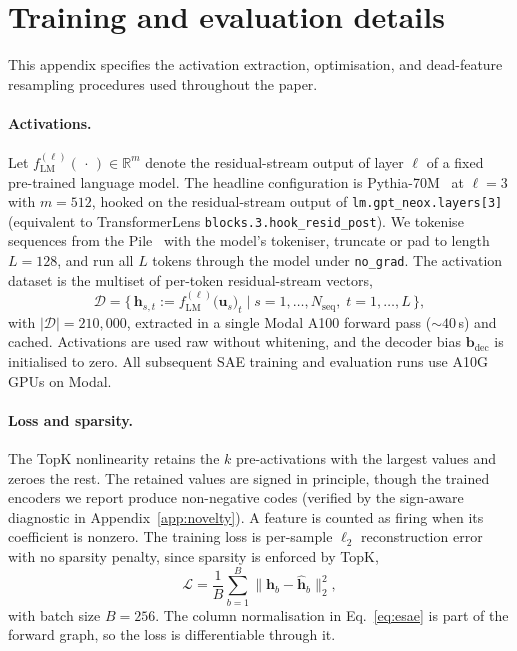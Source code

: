 \documentclass{article}
\theoremstyle{plain}
\theoremstyle{definition}
\theoremstyle{remark}
\begin{document}
\section{Training and evaluation details}
\label{app:training_details}

This appendix specifies the activation extraction, optimisation, and dead-feature resampling procedures used throughout the paper.

\paragraph{Activations.} Let $f_{\mathrm{LM}}^{(\ell)}(\,\cdot\,) \in \mathbb{R}^m$ denote the residual-stream output of layer $\ell$ of a fixed pre-trained language model. The headline configuration is Pythia-70M~\citep{biderman2023pythia} at $\ell = 3$ with $m = 512$, hooked on the residual-stream output of \texttt{lm.gpt\_neox.layers[3]} (equivalent to TransformerLens \texttt{blocks.3.hook\_resid\_post}). We tokenise sequences from the Pile~\citep{gao2020pile} with the model's tokeniser, truncate or pad to length $L = 128$, and run all $L$ tokens through the model under \texttt{no\_grad}. The activation dataset is the multiset of per-token residual-stream vectors,
\begin{equation}
    \label{eq:dataset}
    \mathcal{D} = \bigl\{\, \mathbf{h}_{s,t} := f_{\mathrm{LM}}^{(\ell)}\!\bigl(\mathbf{u}_s\bigr)_t \;\big|\; s = 1, \ldots, N_{\mathrm{seq}}, \; t = 1, \ldots, L \,\bigr\},
\end{equation}
with $|\mathcal{D}| = 210{,}000$, extracted in a single Modal A100 forward pass ($\sim\!40$\,s) and cached. Activations are used raw without whitening, and the decoder bias $\mathbf{b}_{\mathrm{dec}}$ is initialised to zero. All subsequent SAE training and evaluation runs use A10G GPUs on Modal.

\paragraph{Loss and sparsity.} The TopK nonlinearity retains the $k$ pre-activations with the largest values and zeroes the rest. The retained values are signed in principle, though the trained encoders we report produce non-negative codes (verified by the sign-aware diagnostic in Appendix~\ref{app:novelty}). A feature is counted as firing when its coefficient is nonzero. The training loss is per-sample $\ell_2$ reconstruction error with no sparsity penalty, since sparsity is enforced by TopK,
\begin{equation}
    \label{eq:loss}
    \mathcal{L} = \frac{1}{B} \sum_{b=1}^{B} \bigl\lVert \mathbf{h}_b - \hat{\mathbf{h}}_b \bigr\rVert_2^2,
\end{equation}
with batch size $B = 256$. The column normalisation in Eq.~\eqref{eq:esae} is part of the forward graph, so the loss is differentiable through it.
\end{document}
